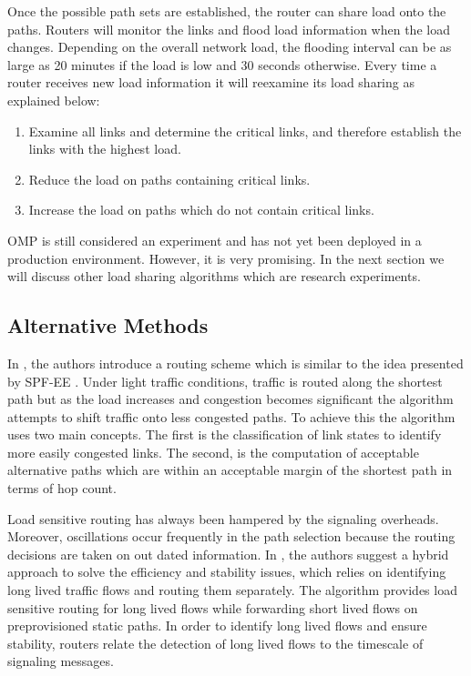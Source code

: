 Once the possible path sets are established, the router can share load onto the paths. Routers will monitor the links and flood load information when the load changes. Depending on the overall network load, the flooding interval can be as large as 20 minutes if the load is low and 30 seconds otherwise. Every time a router receives new load information it will reexamine its load sharing as explained below:

\begin{enumerate}
 \item Examine all links and determine the critical links, and therefore establish the links with the highest load.
 \item Reduce the load on paths containing critical links.
 \item Increase the load on paths which do not contain critical links.
\end{enumerate}

OMP is still considered an experiment and has not yet been deployed in a production environment. However, it is very promising. In the next section we will discuss other load sharing algorithms which are research experiments.

\subsection{Alternative Methods}

In \cite{BAHK}, the authors introduce a routing scheme which is similar to the idea presented by SPF-EE \cite{SPFEE}. Under light traffic conditions, traffic is routed along the shortest path but as the load increases and congestion becomes significant the algorithm attempts to shift traffic onto less congested paths. To achieve this the algorithm uses two main concepts. The first is the classification of link states to identify more easily congested links. The second, is the computation of acceptable alternative paths which are within an acceptable margin of the shortest path in terms of hop count.

Load sensitive routing has always been hampered by the signaling overheads. Moreover, oscillations occur frequently in the path selection because the routing decisions are taken on out dated information. In \cite{LLIP}, the authors suggest a hybrid approach to solve the efficiency and stability issues, which relies on identifying long lived traffic flows and routing them separately. The algorithm provides load sensitive routing for long lived flows while forwarding short lived flows on preprovisioned static paths. In order to identify long lived flows and ensure stability, routers relate the detection of long lived flows to the timescale of signaling messages. 

